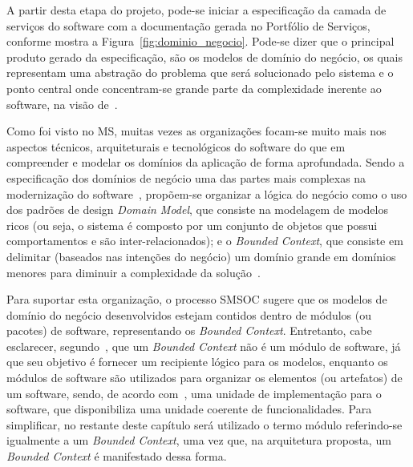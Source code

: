 A partir desta etapa do projeto, 
pode-se
iniciar a especificação 
da camada de serviços do software
com a documentação gerada
no Portfólio de Serviços, 
conforme mostra a Figura~\ref{fig:dominio_negocio}.
Pode-se dizer que o principal produto 
gerado da especificação,
são os modelos de domínio do negócio, 
os quais
representam uma abstração do problema
que será solucionado pelo 
sistema e o ponto central onde concentram-se
grande parte da complexidade inerente ao 
software, na visão de~\cite{S3_Bisbal:1999, S01_bennett2000software, evans2004domain, fowler2002patterns}. 

Como foi visto no \acrshort{MS},
muitas vezes as organizações 
focam-se muito mais nos aspectos técnicos,
arquiteturais e tecnológicos do software 
do que em compreender
e modelar os domínios da aplicação
de forma aprofundada. 
Sendo a especificação 
dos domínios de negócio
uma das partes
mais complexas
na modernização do software~\cite{evans2004domain},
propõem-se
organizar a lógica do negócio
como o uso dos padrões
de design
\textit{Domain Model},
que consiste na
modelagem de
modelos ricos (ou seja, o sistema
é composto por um conjunto de objetos 
que possui comportamentos e são inter-relacionados);
e o \textit{Bounded Context},
que consiste 
em delimitar (baseados nas intenções do negócio) um domínio grande
em domínios menores
para diminuir a complexidade da solução~\cite{fowler2002patterns}.


Para suportar esta organização,
o processo \acrshort{SMSOC} sugere
que os modelos de domínio do negócio
desenvolvidos estejam
contidos dentro de módulos
(ou pacotes) de software, 
representando os \textit{Bounded Context}.
Entretanto, cabe esclarecer,
segundo~\cite{avram2007domain},
que um \textit{Bounded Context} 
não é um módulo de software, 
já que seu objetivo é
fornecer um recipiente lógico para os modelos,
enquanto os módulos de software são utilizados 
para organizar os elementos (ou artefatos)
de um software,
sendo, 
de acordo com~\cite{clements2002documenting}, 
uma unidade
de implementação para o software, 
que disponibiliza
uma unidade coerente de funcionalidades.
Para simplificar, no restante
deste capítulo será utilizado o 
termo módulo referindo-se
igualmente a um \textit{Bounded Context}, uma vez que,
na arquitetura proposta, um \textit{Bounded Context}
é manifestado dessa forma.


